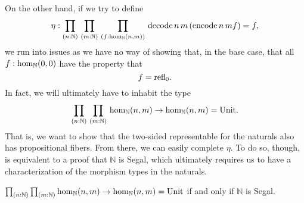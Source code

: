 \documentclass[main.tex]{subfiles}
\begin{document}
On the other hand, if we try to define $$\eta : \prd{n:\mathbb{N}}{m:\mathbb{N}}{f : \ho[\mathbb{N}]{n}{m}}\dco\,n\,m\,(\eco\,n\,m f) =f,$$
we run into issues as we have no way of showing that, in the base case, that all $f : \ho[\mathbb{N}]{0}{0}$ have the property that $$f = \refl{0}.$$
In fact, we will ultimately have to inhabit the type $$\prd{n : \mathbb{N}}{m : \mathbb{N}}\ho[\mathbb{N}]{n}{m} \to \ho[\mathbb{N}]{n}{m}=\Un.$$
That is, we want to show that the two-sided representable for the naturals also has propositional fibers. From there, we can easily complete
$\eta$. To do so, though, is equivalent to a proof that $\mathbb{N}$ is Segal, which ultimately requires us to have a characterization of the 
morphism types in the naturals.
\begin{lemma}
    $\prd{n : \mathbb{N}}{m : \mathbb{N}}\ho[\mathbb{N}]{n}{m} \to \ho[\mathbb{N}]{n}{m}=\Un$ if and only if $\mathbb{N}$ is Segal.
\end{lemma}
\end{document}
